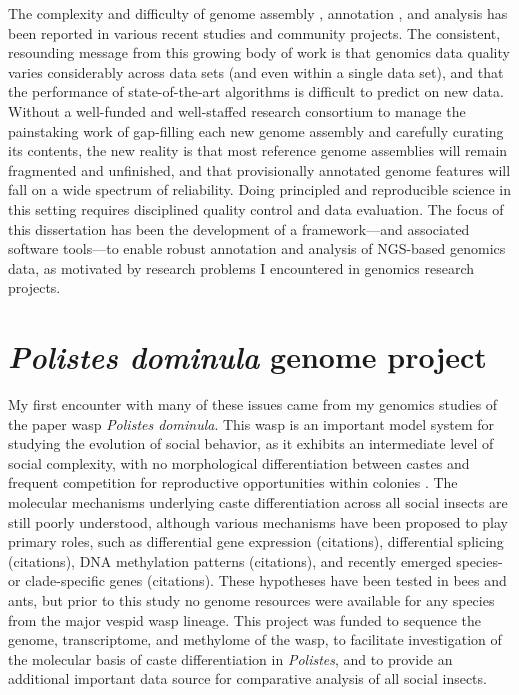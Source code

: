 The complexity and difficulty of genome assembly \cite{Assemblathon1,Assemblathon2,GAGE,QUAST}, annotation \cite{EGASP,Eilbeck,DentonFly}, and analysis \cite{PigWatson,RnaSeqTrim,RnaSeqTrim2} has been reported in various recent studies and community projects.
The consistent, resounding message from this growing body of work is that genomics data quality varies considerably across data sets (and even within a single data set), and that the performance of state-of-the-art algorithms is difficult to predict on new data.
Without a well-funded and well-staffed research consortium to manage the painstaking work of gap-filling each new genome assembly and carefully curating its contents, the new reality is that most reference genome assemblies will remain fragmented and unfinished, and that provisionally annotated genome features will fall on a wide spectrum of reliability.
Doing principled and reproducible science in this setting requires disciplined quality control and data evaluation.
The focus of this dissertation has been the development of a framework---and associated software tools---to enable robust annotation and analysis of NGS-based genomics data, as motivated by research problems I encountered in genomics research projects.

\section{\textit{Polistes dominula} genome project}

My first encounter with many of these issues came from my genomics studies of the paper wasp \textit{Polistes dominula}.
This wasp is an important model system for studying the evolution of social behavior, as it exhibits an intermediate level of social complexity, with no morphological differentiation between castes and frequent competition for reproductive opportunities within colonies \cite{JandtToth}.
The molecular mechanisms underlying caste differentiation across all social insects are still poorly understood, although various mechanisms have been proposed to play primary roles, such as differential gene expression (citations), differential splicing (citations), DNA methylation patterns (citations), and recently emerged species- or clade-specific genes (citations).
These hypotheses have been tested in bees and ants, but prior to this study no genome resources were available for any species from the major vespid wasp lineage.
This project was funded to sequence the genome, transcriptome, and methylome of the wasp, to facilitate investigation of the molecular basis of caste differentiation in \textit{Polistes}, and to provide an additional important data source for comparative analysis of all social insects.

